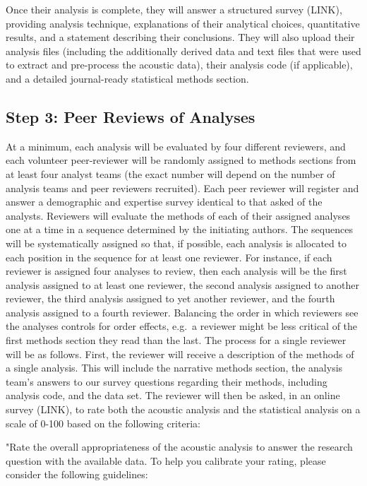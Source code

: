 \documentclass[
  12pt,
]{article}
\begin{document}
Once their analysis is complete, they will answer a structured survey (LINK), providing analysis technique, explanations of their analytical choices, quantitative results, and a statement describing their conclusions.
They will also upload their analysis files (including the additionally derived data and text files that were used to extract and pre-process the acoustic data), their analysis code (if applicable), and a detailed journal-ready statistical methods section.

\hypertarget{step-3-peer-reviews-of-analyses}{%
\subsection{Step 3: Peer Reviews of Analyses}\label{step-3-peer-reviews-of-analyses}}

At a minimum, each analysis will be evaluated by four different reviewers, and each volunteer peer-reviewer will be randomly assigned to methods sections from at least four analyst teams (the exact number will depend on the number of analysis teams and peer reviewers recruited).
Each peer reviewer will register and answer a demographic and expertise survey identical to that asked of the analysts.
Reviewers will evaluate the methods of each of their assigned analyses one at a time in a sequence determined by the initiating authors.
The sequences will be systematically assigned so that, if possible, each analysis is allocated to each position in the sequence for at least one reviewer.
For instance, if each reviewer is assigned four analyses to review, then each analysis will be the first analysis assigned to at least one reviewer, the second analysis assigned to another reviewer, the third analysis assigned to yet another reviewer, and the fourth analysis assigned to a fourth reviewer.
Balancing the order in which reviewers see the analyses controls for order effects, e.g.~a reviewer might be less critical of the first methods section they read than the last.
The process for a single reviewer will be as follows.
First, the reviewer will receive a description of the methods of a single analysis.
This will include the narrative methods section, the analysis team's answers to our survey questions regarding their methods, including analysis code, and the data set.
The reviewer will then be asked, in an online survey (LINK), to rate both the acoustic analysis and the statistical analysis on a scale of 0-100 based on the following criteria:

"Rate the overall appropriateness of the acoustic analysis to answer the research question with the available data. To help you calibrate your rating, please consider the following guidelines:
\end{document}
